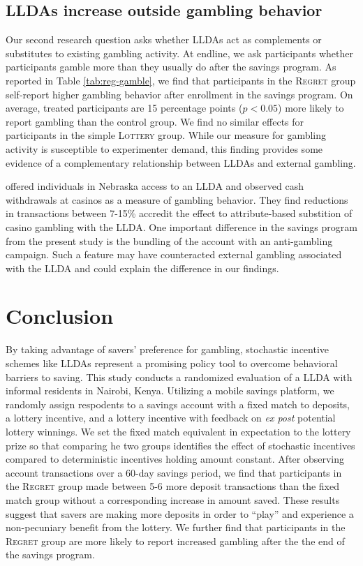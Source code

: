 \documentclass[12pt]{article}
\begin{document}
	\subsection{LLDAs increase outside gambling behavior}

		Our second research question asks whether LLDAs act as complements or substitutes to existing gambling activity. At endline, we ask participants whether participants gamble more than they usually do after the savings program. As reported in Table \ref{tab:reg-gamble}, we find that participants in the \textsc{Regret} group self-report higher gambling behavior after enrollment in the savings program. On average, treated participants are 15 percentage points ($p < 0.05$) more likely to report gambling than the control group. We find no similar effects for participants in the simple \textsc{Lottery} group. While our measure for gambling activity is susceptible to experimenter demand, this finding provides some evidence of a complementary relationship between LLDAs and external gambling.

		 offered individuals in Nebraska access to an LLDA and observed cash withdrawals at casinos as a measure of gambling behavior. They find reductions in transactions between 7-15\% accredit the effect to attribute-based substition of casino gambling with the LLDA. One important difference in the savings program from the present study is the bundling of the account with an anti-gambling campaign. Such a feature may have counteracted external gambling associated with the LLDA and could explain the difference in our findings.

\section{Conclusion} \label{sec:conclusion}

		By taking advantage of savers' preference for gambling, stochastic incentive schemes like LLDAs represent a promising policy tool to overcome behavioral barriers to saving. This study conducts a randomized evaluation of a LLDA with informal residents in Nairobi, Kenya. Utilizing a mobile savings platform, we randomly assign respodents to a savings account with a fixed match to deposits, a lottery incentive, and a lottery incentive with feedback on \textit{ex post} potential lottery winnings. We set the fixed match equivalent in expectation to the lottery prize so that comparing he two groups identifies the effect of stochastic incentives compared to deterministic incentives holding amount constant. After observing account transactions over a 60-day savings period, we find that participants in the \textsc{Regret} group made between 5-6 more deposit transactions than the fixed match group without a corresponding increase in amount saved. These results suggest that savers are making more deposits in order to ``play'' and experience a non-pecuniary benefit from the lottery. We further find that participants in the \textsc{Regret} group are more likely to report increased gambling after the the end of the savings program.
\end{document}
